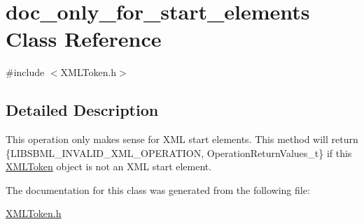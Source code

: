 \hypertarget{classdoc__only__for__start__elements}{}\section{doc\+\_\+only\+\_\+for\+\_\+start\+\_\+elements Class Reference}
\label{classdoc__only__for__start__elements}


{\ttfamily \#include $<$X\+M\+L\+Token.\+h$>$}



\subsection{Detailed Description}
\begin{DoxyParagraph}{}
This operation only makes sense for X\+ML start elements. This method will return \{L\+I\+B\+S\+B\+M\+L\+\_\+\+I\+N\+V\+A\+L\+I\+D\+\_\+\+X\+M\+L\+\_\+\+O\+P\+E\+R\+A\+T\+I\+ON, Operation\+Return\+Values\+\_\+t\} if this \hyperlink{class_x_m_l_token}{X\+M\+L\+Token} object is not an X\+ML start element. 
\end{DoxyParagraph}


The documentation for this class was generated from the following file\+:\begin{DoxyCompactItemize}
\item 
\hyperlink{_x_m_l_token_8h}{X\+M\+L\+Token.\+h}\end{DoxyCompactItemize}
